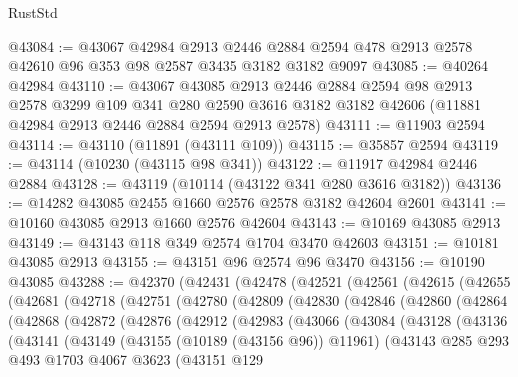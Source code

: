 \begin{lexlean}{RustStd}
\begin{coremodule}
@43084 := @43067
    @42984
    @2913
    @2446
    @2884
    @2594
    @478
    @2913
    @2578
    @42610
    @96
    @353
    @98
    @2587
    @3435
    @3182
    @3182
    @9097
@43085 := @40264 @42984
@43110 := @43067
    @43085
    @2913
    @2446
    @2884
    @2594
    @98
    @2913
    @2578
    @3299
    @109
    @341
    @280
    @2590
    @3616
    @3182
    @3182
    @42606
    (@11881 @42984 @2913 @2446 @2884 @2594 @2913 @2578)
@43111 := @11903 @2594
@43114 := @43110 (@11891 (@43111 @109))
@43115 := @35857 @2594
@43119 := @43114 (@10230 (@43115 @98 @341))
@43122 := @11917 @42984 @2446 @2884
@43128 := @43119 (@10114 (@43122 @341 @280 @3616 @3182))
@43136 := @14282 @43085 @2455 @1660 @2576 @2578 @3182 @42604 @2601
@43141 := @10160 @43085 @2913 @1660 @2576 @42604
@43143 := @10169 @43085 @2913
@43149 := @43143 @118 @349 @2574 @1704 @3470 @42603
@43151 := @10181 @43085 @2913
@43155 := @43151 @96 @2574 @96 @3470
@43156 := @10190 @43085
@43288 := @42370
    (@42431
      (@42478
        (@42521
          (@42561
            (@42615
              (@42655
                (@42681
                  (@42718
                    (@42751
                      (@42780
                        (@42809
                          (@42830
                            (@42846
                              (@42860
                                (@42864
                                  (@42868
                                    (@42872
                                      (@42876
                                        (@42912
                                          (@42983
                                            (@43066
                                              (@43084
                                                (@43128
                                                  (@43136
                                                    (@43141
                                                      (@43149
                                                        (@43155 (@10189 (@43156 @96)) @11961)
                                                        (@43143
                                                          @285
                                                          @293
                                                          @493
                                                          @1703
                                                          @4067
                                                          @3623
                                                          (@43151
                                                            @129

\end{coremodule}
\end{lexlean}
